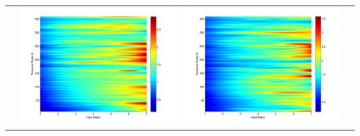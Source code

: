 \documentclass[11pt]{article}
\begin{document}
\begin{table}[H]
{\begin{tabular}{cccc}
&\begin{minipage}{.3\textwidth}\includegraphics[width=\linewidth]{resultgraph/06908000pep.png}\end{minipage}
&\begin{minipage}{.3\textwidth}\includegraphics[width=\linewidth]{resultgraph/06908000pepq.png}\end{minipage} 
\\

\end{tabular}}
\end{table}
\end{document}
